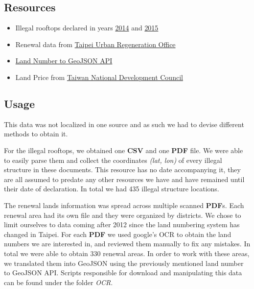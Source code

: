 \documentclass[12pt]{article}
\begin{document}
\subsection{Resources}
\begin{itemize}
\item Illegal rooftops declared in years \href{https://www.google.com/maps/d/u/0/viewer?mid=1IrEuuGz5J3jnpOkcHxnIozvXgfs&ll=25.06126232467532\%2C121.55392830000005&z=12}{2014} and \href{https://www.udd.gov.taipei/FileUpload/38-10589/Documents/208\%E9\%A0\%82\%E6\%A8\%93\%E5\%B0\%88\%E6\%A1\%88\%E6\%A1\%88\%E4\%BB\%B6\%E6\%B8\%85\%E5\%86\%8A(1061025\%E6\%9B\%B4\%E6\%96\%B0).pdf}{2015}
\item Renewal data from \href{https://uro.gov.taipei/News.aspx?n=AF4D78CF694B745C\&sms=CCC54E6046E281ED
}{Taipei Urban Regeneration Office}
\item \href{https://twland.ronny.tw}{Land Number to GeoJSON API}
\item Land Price from \href{https://data.gov.tw/dataset/62206 }{Taiwan National Development Council}
\end{itemize}

\subsection{Usage}
This data was not localized in one source and as such we had to devise different methods to obtain it. 

For the illegal rooftops, we obtained one \textbf{CSV} and one \textbf{PDF} file. We were able to easily parse them and collect the coordinates \textit{(lat, lon)} of every illegal structure in these documents. This resource has no date accompanying it, they are all assumed to predate any other resources we have and have remained until their date of declaration. In total we had 435 illegal structure locations.

The renewal lands information was spread across multiple scanned \textbf{PDF}s. Each renewal area had its own file and they were organized by districts. We chose to limit ourselves to data coming after 2012 since the land numbering system has changed in Taipei. For each \textbf{PDF} we used google's OCR to obtain the land numbers we are interested in, and reviewed them manually to fix any mistakes. In total we were able to obtain 330 renewal areas. In order to work with these areas, we translated them into GeoJSON using the previously mentioned land number to GeoJSON API. Scripts responsible for download and manipulating this data can be found under the folder \textit{OCR}.
\end{document}

